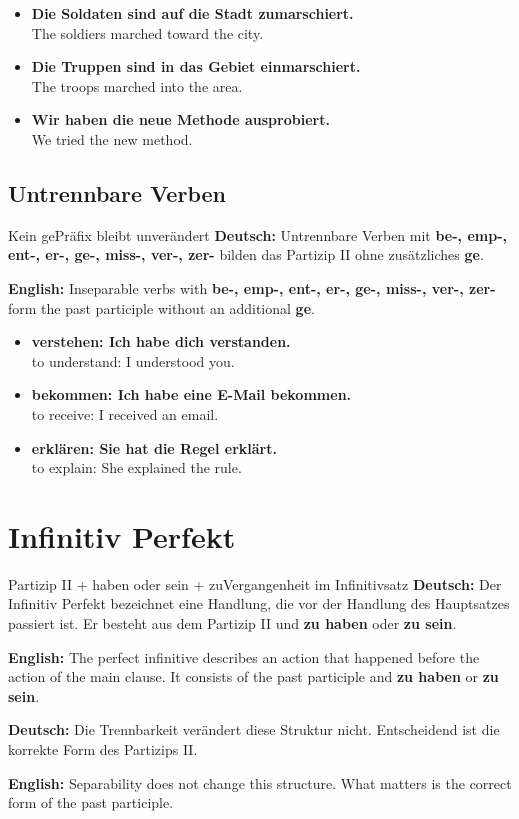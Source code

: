 \documentclass[a4paper,11pt]{article}
\newcommand{\GermanText}[1]{\textbf{Deutsch: }#1\par}
\newcommand{\EnglishText}[1]{{\small\color{SoftGray}\textbf{English: }#1\par}}
\newcommand{\ExampleItem}[2]{\item \textbf{#1}\\{\small\color{SoftGray}#2}}
\begin{document}
        \begin{exbox}
            \begin{itemize}
                \ExampleItem{Die Soldaten sind auf die Stadt zumarschiert.}{The soldiers marched toward the city.}
                \ExampleItem{Die Truppen sind in das Gebiet einmarschiert.}{The troops marched into the area.}
                \ExampleItem{Wir haben die neue Methode ausprobiert.}{We tried the new method.}
            \end{itemize}
        \end{exbox}

        \subsection{Untrennbare Verben}

        \begin{grammarentry}{Kein \glqq ge\grqq}{Präfix bleibt unverändert}
            \GermanText{Untrennbare Verben mit \textbf{be-, emp-, ent-, er-, ge-, miss-, ver-, zer-} bilden das Partizip II ohne zusätzliches \textbf{ge}.}
            \EnglishText{Inseparable verbs with \textbf{be-, emp-, ent-, er-, ge-, miss-, ver-, zer-} form the past participle without an additional \textbf{ge}.}
        \end{grammarentry}

        \begin{exbox}
            \begin{itemize}
                \ExampleItem{verstehen: Ich habe dich verstanden.}{to understand: I understood you.}
                \ExampleItem{bekommen: Ich habe eine E-Mail bekommen.}{to receive: I received an email.}
                \ExampleItem{erklären: Sie hat die Regel erklärt.}{to explain: She explained the rule.}
            \end{itemize}
        \end{exbox}


    \section{Infinitiv Perfekt}

        \begin{grammarentry}{Partizip II + haben oder sein + zu}{Vergangenheit im Infinitivsatz}
            \GermanText{Der Infinitiv Perfekt bezeichnet eine Handlung, die vor der Handlung des Hauptsatzes passiert ist. Er besteht aus dem Partizip II und \textbf{zu haben} oder \textbf{zu sein}.}
            \EnglishText{The perfect infinitive describes an action that happened before the action of the main clause. It consists of the past participle and \textbf{zu haben} or \textbf{zu sein}.}

            \GermanText{Die Trennbarkeit verändert diese Struktur nicht. Entscheidend ist die korrekte Form des Partizips II.}
            \EnglishText{Separability does not change this structure. What matters is the correct form of the past participle.}
        \end{grammarentry}
\end{document}
